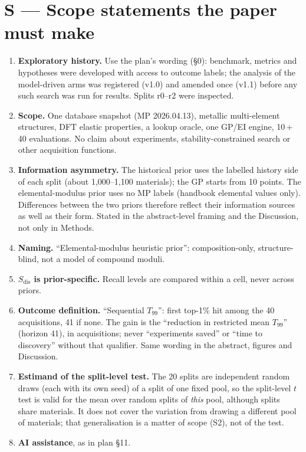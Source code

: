 \documentclass[10pt,a4paper]{article}
\newcommand{\Sdis}{$S_{\mathrm{dis}}$}
\begin{document}
\section*{S --- Scope statements the paper must make}
\begin{enumerate}[label=\textbf{S\arabic*},leftmargin=*]
\item \textbf{Exploratory history.} Use the plan's wording (\S0): benchmark, metrics and hypotheses were developed with access to outcome labels; the
analysis of the model-driven arms was registered (v1.0) and amended once (v1.1) before any such search was run for results. Splits r0--r2 were inspected.
\item \textbf{Scope.} One database snapshot (MP 2026.04.13), metallic multi-element structures, DFT elastic properties, a lookup oracle, one GP/EI
engine, 10\,+\,40 evaluations. No claim about experiments, stability-constrained search or other acquisition functions.
\item \textbf{Information asymmetry.} The historical prior uses the labelled history side of each split (about 1,000--1,100 materials); the GP starts from
10 points. The elemental-modulus prior uses no MP labels (handbook elemental values only). Differences between the two priors therefore reflect their
information sources as well as their form. Stated in the abstract-level framing and the Discussion, not only in Methods.
\item \textbf{Naming.} ``Elemental-modulus heuristic prior'': composition-only, structure-blind, not a model of compound moduli.
\item \textbf{\Sdis{} is prior-specific.} Recall levels are compared within a cell, never across priors.
\item \textbf{Outcome definition.} ``Sequential $T_{99}$'': first top-1\% hit among the 40 acquisitions, 41 if none. The gain is the ``reduction in restricted mean $T_{99}$'' (horizon 41), in acquisitions; never ``experiments saved'' or ``time to discovery'' without that qualifier. Same wording in the abstract, figures and Discussion.
\item \textbf{Estimand of the split-level test.} The 20 splits are independent random draws (each with its own seed) of a split of one fixed pool, so the split-level $t$ test is valid for the mean over random splits of \emph{this} pool, although splits share materials. It does not cover the variation from drawing a different pool of materials; that generalisation is a matter of scope (S2), not of the test.
\item \textbf{AI assistance}, as in plan \S11.
\end{enumerate}
\end{document}
